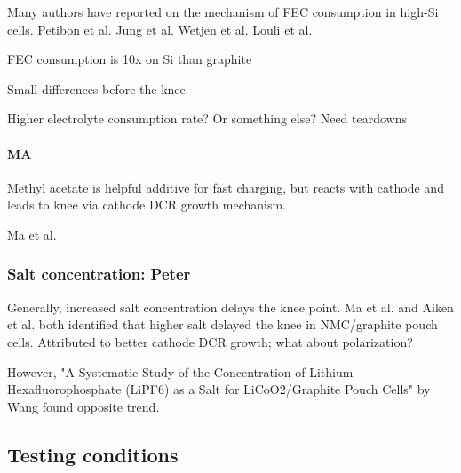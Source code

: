 \documentclass{article}
\begin{document}
Many authors have reported on the mechanism of FEC consumption in high-Si cells.
Petibon et al.\cite{petibon_studies_2016}
Jung et al.\cite{jung_consumption_2016}
Wetjen et al.\cite{wetjen_differentiating_2017}
Louli et al.\cite{louli_operando_2019}

FEC consumption is 10x on Si than graphite

Small differences before the knee

Higher electrolyte consumption rate? Or something else? Need teardowns

\paragraph{MA}

Methyl acetate is helpful additive for fast charging, but reacts with cathode and leads to knee via cathode DCR growth mechanism.

Ma et al.\cite{ma_editors_2019}

\subsubsection{Salt concentration: Peter}

Generally, increased salt concentration delays the knee point.
Ma et al.\cite{ma_editors_2019} and Aiken et al.\cite{aiken_accelerated_2020} both identified that higher salt delayed the knee in NMC/graphite pouch cells.
Attributed to better cathode DCR growth; what about polarization?

However, "A Systematic Study of the Concentration of Lithium Hexafluorophosphate (LiPF6) as a Salt for LiCoO2/Graphite Pouch Cells" by Wang found opposite trend.

\subsection{Testing conditions}
\end{document}

